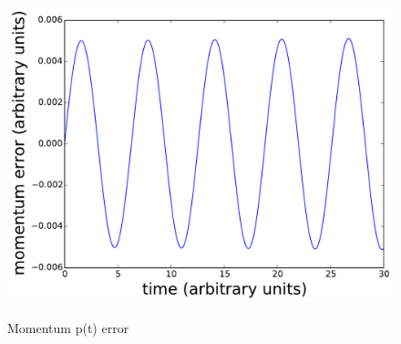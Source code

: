 \begin{figure}
{            \includegraphics[scale=0.24]{fig/ho/ho_p(t)-error_euler_symplectic.pdf}
            \label{fig:ho_p(t)-error_euler_symplectic}
        }
        \caption{Momentum p(t) error}
    \label{fig:ho_p(t)-error_euler}
\end{figure}

